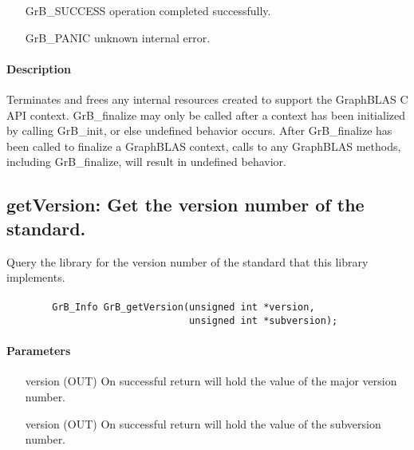 \begin{itemize}[leftmargin=2.1in]
\item[{\sf GrB\_SUCCESS}]        operation completed successfully.
\item[{\sf GrB\_PANIC}]          unknown internal error.
\end{itemize}

\paragraph{Description}

Terminates and frees any internal resources created to support the
GraphBLAS C API context.  {\sf GrB\_finalize} may only be called after
a context has been initialized by calling {\sf GrB\_init}, or else undefined
behavior occurs.  After {\sf GrB\_finalize}
has been called to finalize a GraphBLAS context, calls to any GraphBLAS methods,
including {\sf GrB\_finalize}, will result in undefined behavior.


\subsection{{\sf getVersion}: Get the version number of the standard.}

Query the library for the version number of the standard that this library
implements.

\paragraph{\syntax}

\begin{verbatim}
        GrB_Info GrB_getVersion(unsigned int *version,
                                unsigned int *subversion);
\end{verbatim}


\paragraph{Parameters}

\begin{itemize}[leftmargin=1.1in]
	\item[{\sf version}] ({\sf OUT})  On successful return will hold the value
    of the major version number.
	\item[{\sf version}] ({\sf OUT})  On successful return will hold the value
    of the subversion number.
\end{itemize}


